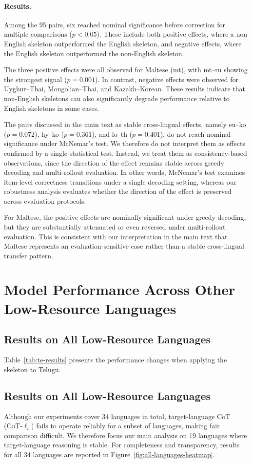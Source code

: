 \paragraph{Results.}
Among the 95 pairs, six reached nominal significance before correction for multiple comparisons ($p<0.05$). These include both positive effects, where a non-English skeleton outperformed the English skeleton, and negative effects, where the English skeleton outperformed the non-English skeleton.

The three positive effects were all observed for Maltese (mt), with mt--ru showing the strongest signal ($p=0.001$). In contrast, negative effects were observed for Uyghur--Thai, Mongolian--Thai, and Kazakh--Korean. These results indicate that non-English skeletons can also significantly degrade performance relative to English skeletons in some cases.

The pairs discussed in the main text as stable cross-lingual effects, namely eu--ko ($p=0.072$), hy--ko ($p=0.361$), and lo--th ($p=0.401$), do not reach nominal significance under McNemar's test. We therefore do not interpret them as effects confirmed by a single statistical test. Instead, we treat them as consistency-based observations, since the direction of the effect remains stable across greedy decoding and multi-rollout evaluation. In other words, McNemar's test examines item-level correctness transitions under a single decoding setting, whereas our robustness analysis evaluates whether the direction of the effect is preserved across evaluation protocols.

For Maltese, the positive effects are nominally significant under greedy decoding, but they are substantially attenuated or even reversed under multi-rollout evaluation. This is consistent with our interpretation in the main text that Maltese represents an evaluation-sensitive case rather than a stable cross-lingual transfer pattern.

\section{Model Performance Across Other Low-Resource Languages}
\subsection{Results on All Low-Resource Languages}

Table~\ref{tab:te-results} presents the performance changes when applying the skeleton to Telugu.


\subsection{Results on All Low-Resource Languages}
Although our experiments cover 34 languages in total, target-language CoT (\textsc{CoT-$\ell_t$}) fails to operate reliably for a subset of languages, making fair comparison difficult. We therefore focus our main analysis on 19 languages where target-language reasoning is stable. For completeness and transparency, results for all 34 languages are reported in Figure~\ref{fig:all-languages-heatmap}.